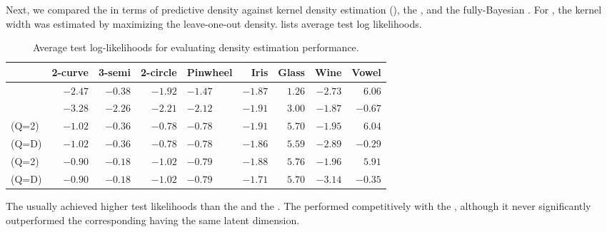 Next, we compared the \iwmm{} in terms of predictive density against kernel density estimation (\KDE{}), the \iGMM{}, and the fully-Bayesian \gplvm{}.
For \KDE{}, the kernel width was estimated by maximizing the leave-one-out density.
%
 lists average test log likelihoods.
%
\begin{table}[ht!]
\centering
\caption[Predictive likelihood comparison]
{Average test log-likelihoods for evaluating density estimation performance.}
\label{tab:likelihood}
\begin{tabular}{lrrrm{1cm}rrrr}
\hline
& 2-curve & 3-semi & 2-circle & Pinwheel & Iris  & Glass  & Wine  & Vowel  \\
\hline 
\KDE{} & $-2.47$ & $-0.38$ & $-1.92$ & $-1.47$ & $\mathbf{-1.87}$ & $1.26$ & $-2.73$ & $\mathbf{6.06}$ \\
\iGMM{} & $-3.28$ & $-2.26$ & $-2.21$ & $-2.12$ & $-1.91$ & $3.00$ & $\mathbf{-1.87}$ & $-0.67$ \\
\gplvm{}(Q=2) & $-1.02$ & $-0.36$ & $\mathbf{-0.78}$ & $\mathbf{-0.78}$ & $-1.91$ & $\mathbf{5.70}$ & $\mathbf{-1.95}$ & $\mathbf{6.04}$ \\
\gplvm{}(Q=D) & $-1.02$ & $-0.36$ & $\mathbf{-0.78}$ & $\mathbf{-0.78}$ & $-1.86$ & $\mathbf{5.59}$ & $-2.89$ & $-0.29$ \\
\iwmm{}(Q=2) & $\mathbf{-0.90}$ & $\mathbf{-0.18}$ & $\mathbf{-1.02}$ & $\mathbf{-0.79}$ & $\mathbf{-1.88}$ & $\mathbf{5.76}$ & $\mathbf{-1.96}$ & $\mathbf{5.91}$ \\
\iwmm{}(Q=D) & $\mathbf{-0.90}$ & $\mathbf{-0.18}$ & $\mathbf{-1.02}$ & $\mathbf{-0.79}$ & $\mathbf{-1.71}$ & $\mathbf{5.70}$ & $-3.14$ & $-0.35$ \\
\hline
\end{tabular}
\end{table}


The \iwmm{} usually achieved higher test likelihoods than the \KDE{} and the \iGMM{}.
%
The \gplvm{} performed competitively with the \iwmm{}, although it never significantly outperformed the corresponding \iwmm{} having the same latent dimension.

